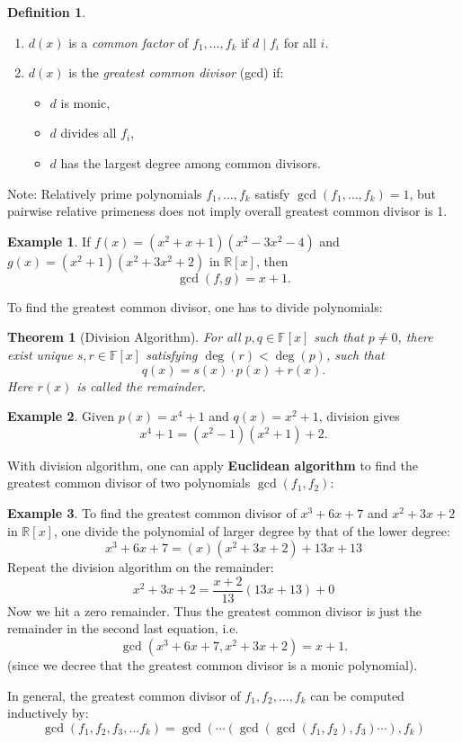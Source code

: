 \documentclass[11pt,openany]{book}
\theoremstyle{plain}
\newtheorem{theorem}{Theorem}[chapter]
\theoremstyle{definition}
\newtheorem{definition}[definition]{Definition}
\newtheorem{example}[example]{Example}
\theoremstyle{remark}
\begin{document}
\begin{definition}  
\begin{enumerate}
    \item $d(x)$ is a \textit{common factor} of $f_1, \dots, f_k$ if $d \mid f_i$ for all $i$.
    \item $d(x)$ is the \textit{greatest common divisor} (gcd) if:
    \begin{itemize}
        \item $d$ is monic,
        \item $d$ divides all $f_i$,
        \item $d$ has the largest degree among common divisors.
    \end{itemize}
\end{enumerate}
\end{definition}
Note: Relatively prime polynomials $f_1, \dots, f_k$ satisfy $\gcd(f_1,\dots,f_k) = 1$, but pairwise relative primeness does not imply overall greatest common divisor is 1.


\begin{example}  
If $f(x) = (x^2 + x + 1)(x^2 - 3x^2 - 4)$ and $g(x) = (x^2 + 1)(x^2 + 3x^2 + 2)$ in $\mathbb{R}[x]$, then
\[
    \gcd(f,g) = x +1.
\]
\end{example}

To find the greatest common divisor, one has to divide polynomials:
\begin{theorem} [Division Algorithm] 
For all $p,q \in \mathbb{F}[x]$ such that $p \neq 0$, there exist unique $s,r \in \mathbb{F}[x]$ satisfying $\deg(r) < \deg(p)$, such that
\[
    q(x) = s(x) \cdot p(x) + r(x).
\]
Here $r(x)$ is called the \textit{remainder}.
\end{theorem}

\begin{example}  
Given $p(x) = x^4 + 1$ and $q(x) = x^2 + 1$, division gives
\[
    x^4 + 1 = (x^2 - 1)(x^2 + 1) + 2.
\]
\end{example}

With division algorithm, one can apply {\bf Euclidean algorithm} to find the greatest common divisor of two polynomials $\gcd(f_1, f_2)$:

\begin{example} To find the greatest common divisor of $x^3 + 6x + 7$ and $x^2 + 3x + 2$ in $\mathbb{R}[x]$, one divide the polynomial of larger degree by that of the lower degree:
\[
    x^3 + 6x + 7 = (x)(x^2 + 3x + 2) + 13x + 13
\]
Repeat the division algorithm on the remainder:
\[
    x^2 + 3x + 2 = \frac{x+2}{13}(13x+13) + 0
\]
Now we hit a zero remainder. Thus the greatest common divisor is just the remainder in the second last equation, i.e.
\[
    \gcd(x^3 + 6x + 7, x^2 + 3x + 2) = x + 1.
\]
(since we decree that the greatest common divisor is a monic polynomial).
\end{example}
In general, the greatest common divisor of $f_1, f_2, \dots, f_k$ can be computed inductively by:
$$\gcd(f_1, f_2, f_3, \dots f_k) = \gcd(\cdots(\gcd(\gcd(f_1,f_2),f_3)\cdots),f_k) $$
\end{document}
